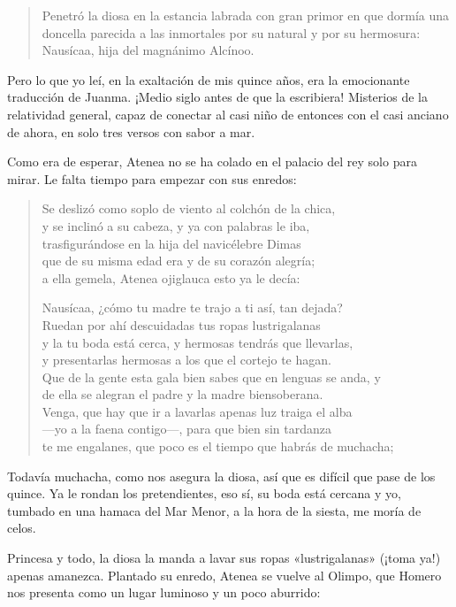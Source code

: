 \begin{quote}
Penetró la diosa en la estancia labrada con gran primor en que dormía una doncella parecida a las inmortales por su natural y por su hermosura: Nausícaa, hija del magnánimo Alcínoo.
\end{quote}

Pero lo que yo leí, en la exaltación de mis quince años, era la emocionante traducción de Juanma. ¡Medio siglo antes de que la escribiera! Misterios de la relatividad general, capaz de conectar al casi niño de entonces con el casi anciano de ahora, en solo tres versos con sabor a mar.

Como era de esperar, Atenea no se ha colado en el palacio del rey solo para mirar. Le falta tiempo para empezar con sus enredos:

\begin{verse}
Se deslizó como soplo de viento al colchón de la chica,\\
y se inclinó a su cabeza, y ya con palabras le iba,\\
trasfigurándose en la hija del navicélebre Dimas\\
que de su misma edad era y de su corazón alegría;\\
a ella gemela, Atenea ojiglauca esto ya le decía:

Nausícaa, ¿cómo tu madre te trajo a ti así, tan dejada?\\
Ruedan por ahí descuidadas tus ropas lustrigalanas\\
y la tu boda está cerca, y hermosas tendrás que llevarlas,\\
y presentarlas hermosas a los que el cortejo te hagan.\\
Que de la gente esta gala bien sabes que en lenguas se anda, y\\
de ella se alegran el padre y la madre biensoberana.\\
Venga, que hay que ir a lavarlas apenas luz traiga el alba\\
---yo a la faena contigo---, para que bien sin tardanza\\
te me engalanes, que poco es el tiempo que habrás de muchacha;
\end{verse}

Todavía muchacha, como nos asegura la diosa, así que es difícil que pase de los quince. Ya le rondan los pretendientes, eso sí, su boda está cercana y yo, tumbado en una hamaca del Mar Menor, a la hora de la siesta, me moría de celos.

Princesa y todo, la diosa la manda a lavar sus ropas «lustrigalanas» (¡toma ya!) apenas amanezca. Plantado su enredo, Atenea se vuelve al Olimpo, que Homero nos presenta como un lugar luminoso y un poco aburrido:

